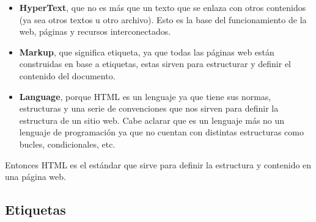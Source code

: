 \documentclass[11pt]{scrartcl}
\begin{document}
\begin{itemize}
    \item \textbf{HyperText}, que no es más que un texto que se enlaza con otros contenidos (ya sea otros textos u otro archivo).
    Esto es la base del funcionamiento de la web, páginas y recursos interconectados.
    \item \textbf{Markup}, que significa etiqueta, ya que todas las páginas web están construidas en base a etiquetas, estas sirven para
    estructurar y definir el contenido del documento.
    \item \textbf{Language}, porque HTML es un lenguaje ya que tiene sus normas, estructuras y una serie de convenciones que nos sirven para definir
    la estructura de un sitio web. Cabe aclarar que es un lenguaje más no un lenguaje de programación ya que no cuentan con distintas estructuras como bucles, condicionales, etc.
\end{itemize}


Entonces HTML es el estándar que sirve para definir la estructura y contenido en una página web.


    \subsection{Etiquetas}
\end{document}
